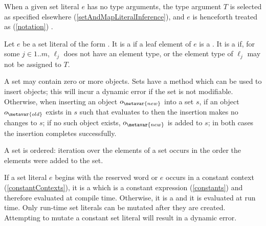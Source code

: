 \documentclass[makeidx]{article}
\begin{document}
{\LMHash{}%
When a given set literal $e$ has no type arguments,
the type argument $T$ is selected as specified elsewhere
(\ref{setAndMapLiteralInference}),
and $e$ is henceforth treated as
(\ref{notation})
.


\LMHash{}%
Let $e$ be a set literal of the form
.
It is a  if a leaf element of $e$ is a
.
It is a  if, for some $j \in 1 .. m$,
$\ell_j$ does not have an element type,
or the element type of $\ell_j$ may not be assigned to $T$.

\LMHash{}%
A set may contain zero or more objects.
Sets have a method which can be used to insert objects;
this will incur a dynamic error if the set is not modifiable.
Otherwise, when inserting an object $o_{\metavar{new}}$ into a set $s$,
if an object $o_{\metavar{old}}$ exists in $s$ such that
 evaluates to \TRUE{}
then the insertion makes no changes to $s$;
if no such object exists,
$o_{\metavar{new}}$ is added to $s$;
in both cases the insertion completes successfully.

\LMHash{}%
A set is ordered: iteration over the elements of a set
occurs in the order the elements were added to the set.


\LMHash{}%
If a set literal $e$ begins with the reserved word \CONST{}
or $e$ occurs in a constant context
(\ref{constantContexts}),
it is a
which is a constant expression
(\ref{constants})
and therefore evaluated at compile time.
Otherwise, it is a
and it is evaluated at run time.
Only run-time set literals can be mutated after they are created.
Attempting to mutate a constant set literal will result in a dynamic error.

}
\end{document}
